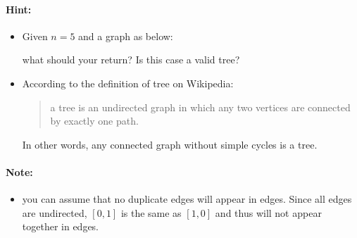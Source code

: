 \paragraph{Hint:}
\begin{itemize}
\item Given $n = 5$ and a graph as below:
\begin{figure}[H]
\centering
{}
\end{figure}
what should your return? Is this case a valid tree?
\item According to the definition of tree on Wikipedia: 
\begin{quote}
a tree is an undirected graph in which any two vertices are connected by exactly one path. 
\end{quote}
In other words, any connected graph without simple cycles is a tree.
\end{itemize}

\paragraph{Note:}
\begin{itemize}
\item you can assume that no duplicate edges will appear in edges. Since all edges are undirected, $[0, 1]$ is the same as $[1, 0]$ and thus will not appear together in edges.
\end{itemize}
